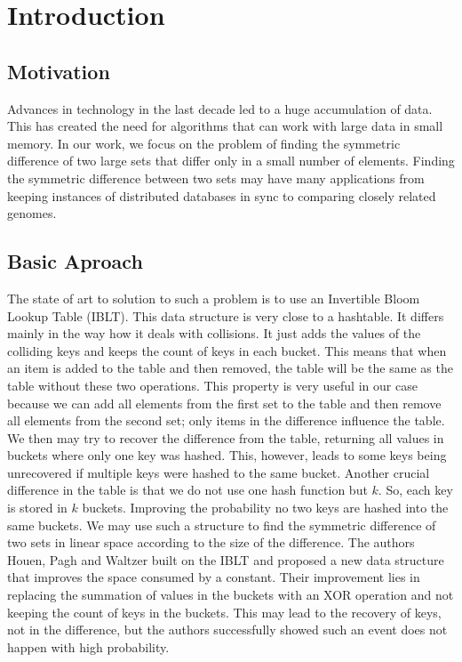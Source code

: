 \chapter*{Introduction}

\section*{Motivation}

Advances in technology in the last decade led to a huge accumulation of data. 
This has created the need for algorithms that can work with large data in small memory. 
In our work, we focus on the problem of finding the symmetric difference of two large sets 
that differ only in a small number of elements. 
Finding the symmetric difference between two sets may have many applications 
from keeping instances of distributed databases in sync to comparing closely related genomes.

\section*{Basic Aproach}
The state of art to solution to such a problem is 
to use an Invertible Bloom Lookup Table (IBLT). This data structure is very close to a hashtable.
It differs mainly in the way how it deals with collisions. It just adds the values of the colliding keys and keeps the count of keys in each bucket.
This means that when an item is added to the table and then removed, the table will be the same as the table without these two operations.
This property is very useful in our case because we can add all elements from the first set to the table and then remove all elements from the second set; only items in the difference influence the table. We then may try to recover the difference from the table, returning all values in buckets where only one key was hashed. This, however, leads to some keys being unrecovered if multiple keys were hashed to the same bucket.
Another crucial difference in the table is that we do not use one hash function but $k$. So, each key is stored in $k$ buckets. 
Improving the probability no two keys are hashed into the same buckets.
We may use such a structure to find the symmetric difference of two sets in linear space according to the size of the difference.
The authors Houen, Pagh and Waltzer built on the IBLT and proposed a new data structure that improves the space consumed by a constant. \cite{doi:10.1137/1.9781611977585.ch21} 
Their improvement lies in replacing the summation of values in the buckets with an XOR operation and not keeping the count of keys in the buckets.
This may lead to the recovery of keys, not in the difference, but the authors successfully showed such an event does not happen with high probability.

